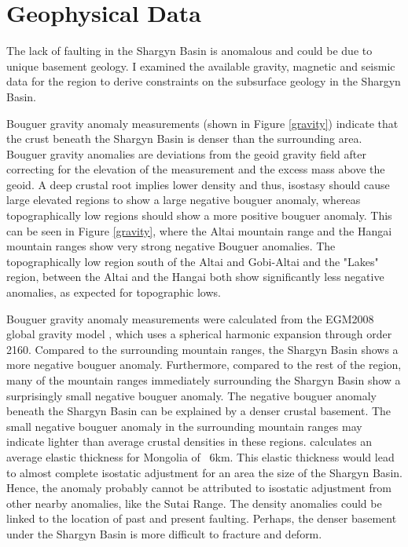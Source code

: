 \section{Geophysical Data}
	The lack of faulting in the Shargyn Basin is anomalous and could be due to unique basement geology. I examined the available gravity, magnetic and seismic data for the region to derive constraints on the subsurface geology in the Shargyn Basin.

	Bouguer gravity anomaly measurements (shown in Figure \ref{gravity}) indicate that the crust beneath the Shargyn Basin is denser than the surrounding area. Bouguer gravity anomalies are deviations from the geoid gravity field after correcting for the elevation of the measurement and the excess mass above the geoid. A deep crustal root implies lower density and thus, isostasy should cause large elevated regions to show a large negative bouguer anomaly, whereas topographically low regions should show a more positive bouguer anomaly. This can be seen in Figure \ref{gravity}, where the Altai mountain range and the Hangai mountain ranges show very strong negative Bouguer anomalies. The topographically low region south of the Altai and Gobi-Altai and the "Lakes" region, between the Altai and the Hangai both show significantly less negative anomalies, as expected for topographic lows.
	
	Bouguer gravity anomaly measurements were calculated from the EGM2008 global gravity model \citep{EGM2008}, which uses a spherical harmonic expansion through order 2160. Compared to the surrounding mountain ranges, the Shargyn Basin shows a more negative bouguer anomaly. Furthermore, compared to the rest of the region, many of the mountain ranges immediately surrounding the Shargyn Basin show a surprisingly small negative bouguer anomaly. The negative bouguer anomaly beneath the Shargyn Basin can be explained by a denser crustal basement. The small negative bouguer anomaly in the surrounding mountain ranges may indicate lighter than average crustal densities in these regions. \citet{Bayasgalan2005a} calculates an average elastic thickness for Mongolia of ~6km. This elastic thickness would lead to almost complete isostatic adjustment for an area the size of the Shargyn Basin. Hence, the anomaly probably cannot be attributed to isostatic adjustment from other nearby anomalies, like the Sutai Range. The density anomalies could be linked to the location of past and present faulting. Perhaps, the denser basement under the Shargyn Basin is more difficult to fracture and deform.

